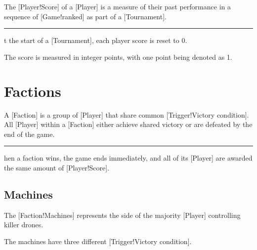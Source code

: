 The [Player!Score] of a [Player] is a measure of their past performance in a sequence of [Game!ranked] as part of a [Tournament].

\begin{rules}
    \rule{player.score.init} At the start of a [Tournament], each player score is reset to \(0\).
\end{rules}

The score is measured in integer points, with one point being denoted as \SI{1}{\points}.

\section{Factions}

A [Faction] is a group of [Player] that share common [Trigger!Victory condition].
All [Player] within a [Faction] either achieve shared victory or are defeated by the end of the game.

\begin{rules}
    \rule{faction.victory} When a faction wins, the game ends immediately, and all of its [Player] are awarded the same amount of [Player!Score].
\end{rules}

\subsection{Machines}

The [Faction!Machines] represents the side of the majority [Player] controlling killer drones.

The machines have three different [Trigger!Victory condition].

